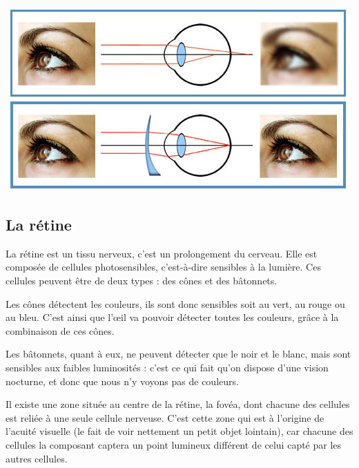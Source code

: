 \documentclass[a4paper, 12pt, onecolumn, openany]{report}
\begin{document}
	\includegraphics[scale=0.5]{astigmatisme3.jpg}
	
	\newpage
	
	\subsection{La rétine}
	
	La rétine est un tissu nerveux, c’est un prolongement du cerveau. Elle est composée de cellules photosensibles, c'est-à-dire sensibles à la lumière. Ces cellules peuvent être de deux types : des cônes et des bâtonnets. 
	
	Les cônes détectent les couleurs, ils sont donc sensibles soit au vert, au rouge ou au bleu. C’est ainsi que l’œil va pouvoir détecter toutes les couleurs, grâce à la combinaison de ces cônes. 
	
	Les bâtonnets, quant à eux, ne peuvent détecter que le noir et le blanc, mais sont sensibles aux faibles luminosités : c’est ce qui fait qu’on dispose d’une vision nocturne, et donc que nous n’y voyons pas de couleurs.
	
	Il existe une zone située au centre de la rétine, la fovéa, dont chacune des cellules est reliée à une seule cellule nerveuse. C’est cette zone qui est à l’origine de l’acuité visuelle (le fait de voir nettement un petit objet lointain), car chacune des cellules la composant captera un point lumineux différent de celui capté par les autres cellules.
	
\end{document}
